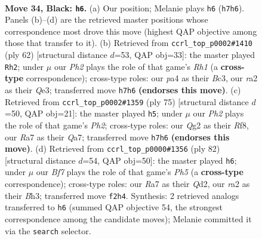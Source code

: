 \documentclass[11pt]{article}
\begin{document}
\clearpage

\begin{figure}[p]\centering
\begin{subfigure}{0.46\textwidth}\centering
\resizebox{\linewidth}{!}{%
\newchessgame
\chessboard[
  setfen={7r/r3k2p/1pp1p1p1/6P1/Pp1P4/1P1KP3/R4bq1/2BQ4 b - - 0 34},
  showmover=false,
  pgfstyle=straightmove, color=movearrow, markmove={h7-h6}
]}
\caption{}
\end{subfigure}\hfill
\begin{subfigure}{0.46\textwidth}\centering
\resizebox{\linewidth}{!}{%
\newchessgame
\chessboard[
  setfen={4r1k1/2q2p2/2p2Pp1/p3p3/P1P2n1p/1PB1QP1P/8/1K5R w - - 0 32},
  showmover=false,
  pgfstyle=straightmove, color=movearrow, markmove={h1-h2}
]}
\caption{}
\end{subfigure}
\\[4pt]
\begin{subfigure}{0.46\textwidth}\centering
\resizebox{\linewidth}{!}{%
\newchessgame
\chessboard[
  setfen={5rk1/q5pp/3p4/p2Pp3/Pp2P3/1P3bPP/2Q2PB1/1R4K1 b - - 2 38},
  showmover=false,
  pgfstyle=straightmove, color=movearrow, markmove={h7-h5}
]}
\caption{}
\end{subfigure}\hfill
\begin{subfigure}{0.46\textwidth}\centering
\resizebox{\linewidth}{!}{%
\newchessgame
\chessboard[
  setfen={4r3/q4k1p/p3pbp1/1p5P/1P2RP2/6PB/3Q3K/8 w - - 1 42},
  showmover=false,
  pgfstyle=straightmove, color=movearrow, markmove={h5-h6}
]}
\caption{}
\end{subfigure}
\caption{\textbf{Move 34, Black: \texttt{h6}.} (a) Our position; Melanie plays \texttt{h6} (\texttt{h7h6}). Panels (b)--(d) are the retrieved master positions whose correspondence most drove this move (highest QAP objective among those that transfer to it). (b) Retrieved from \texttt{ccrl\_top\_p0002\#1410} (ply 62) [structural distance $d$=53, QAP obj=33]: the master played \texttt{Rh2}; under $\mu$ our \emph{Ph2} plays the role of that game's \emph{Rh1} (a \textbf{cross-type} correspondence); cross-type roles: our \emph{p}a4 as their \emph{B}c3, our \emph{r}a2 as their \emph{Q}e3; transferred move \texttt{h7h6} \textbf{(endorses this move)}. (c) Retrieved from \texttt{ccrl\_top\_p0002\#1359} (ply 75) [structural distance $d$=50, QAP obj=21]: the master played \texttt{h5}; under $\mu$ our \emph{Ph2} plays the role of that game's \emph{Ph2}; cross-type roles: our \emph{Q}g2 as their \emph{R}f8, our \emph{R}a7 as their \emph{Q}a7; transferred move \texttt{h7h6} \textbf{(endorses this move)}. (d) Retrieved from \texttt{ccrl\_top\_p0000\#1356} (ply 82) [structural distance $d$=54, QAP obj=50]: the master played \texttt{h6}; under $\mu$ our \emph{Bf7} plays the role of that game's \emph{Ph5} (a \textbf{cross-type} correspondence); cross-type roles: our \emph{R}a7 as their \emph{Q}d2, our \emph{r}a2 as their \emph{B}h3; transferred move \texttt{f2h4}. Synthesis: 2 retrieved analogs transferred to \texttt{h6} (summed QAP objective 54, the strongest correspondence among the candidate moves); Melanie committed it via the \texttt{search} selector.}
\label{fig:thought-m67}
\end{figure}
\end{document}
